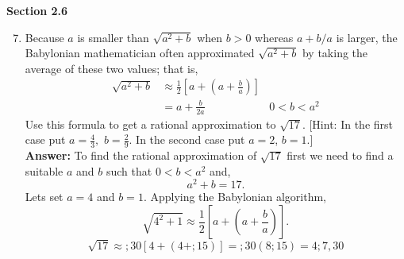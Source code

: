 \documentclass[12pt]{article}
\theoremstyle{homework}
\begin{document}
\textbf{Section 2.6}
\begin{enumerate}
\setcounter{enumi}{6}
\item Because $a$ is smaller than $\sqrt{a^2+b}$ when $b>0$ whereas $a+b/a$ is larger, the Babylonian mathematician often approximated $\sqrt{a^2+b}$ by taking the average of these two values; that is,
\begin{align*}
\sqrt{a^2+b}&\approx\frac{1}{2}\left[a+\left(a+\frac{b}{a}\right)\right]\\
&=a +\frac{b}{2a} &0<b<a^2
\end{align*}
Use this formula to get a rational approximation to $\sqrt{17}$. [Hint: In the first case put $a=\frac{4}{3},$ $b=\frac{2}{9}$. In the second case put $a=2$, $b=1$.]\\

\textbf{Answer:} To find the rational approximation of $\sqrt{17}$ first we need to find a suitable $a$ and $b$ such that $0 < b < a^2$ and,
\begin{equation*}
  a^2 + b = 17. 
\end{equation*}
Lets set $a = 4$ and $b = 1$. Applying the Babylonian algorithm,
\begin{equation*}
  \sqrt{4^2 + 1} \approx \frac{1}{2} [a + (a + \frac{b}{a})].
\end{equation*}
\begin{equation*}
  \sqrt{17} \approx ;30 [4 + (4 + ;15)] = ;30(8;15) = 4;7,30
\end{equation*}
\end{enumerate}

\vspace{.5in}
\end{document}
